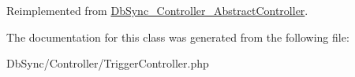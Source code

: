 Reimplemented from \hyperlink{classDbSync__Controller__AbstractController_a12b74400d214770030c52d2f29308f52}{DbSync\_\-Controller\_\-AbstractController}.



The documentation for this class was generated from the following file:\begin{DoxyCompactItemize}
\item 
DbSync/Controller/TriggerController.php\end{DoxyCompactItemize}
